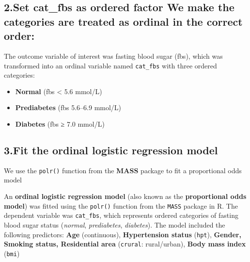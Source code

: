 \documentclass[
  letterpaper,
  DIV=11,
  numbers=noendperiod]{scrartcl}
\newenvironment{Shaded}{\begin{snugshade}}{\end{snugshade}}
\newcommand{\AttributeTok}[1]{\textcolor[rgb]{0.40,0.45,0.13}{#1}}
\newcommand{\FunctionTok}[1]{\textcolor[rgb]{0.28,0.35,0.67}{#1}}
\newcommand{\NormalTok}[1]{\textcolor[rgb]{0.00,0.23,0.31}{#1}}
\newcommand{\OtherTok}[1]{\textcolor[rgb]{0.00,0.23,0.31}{#1}}
\newcommand{\SpecialCharTok}[1]{\textcolor[rgb]{0.37,0.37,0.37}{#1}}
\newcommand{\StringTok}[1]{\textcolor[rgb]{0.13,0.47,0.30}{#1}}
\begin{document}
\subsection{\texorpdfstring{2.Set cat\_fbs as ordered factor We make the
categories are treated as \textbf{ordinal} in the correct
order:}{2.Set cat\_fbs as ordered factor We make the categories are treated as ordinal in the correct order:}}\label{set-cat_fbs-as-ordered-factor-we-make-the-categories-are-treated-as-ordinal-in-the-correct-order}

The outcome variable of interest was fasting blood sugar (fbs), which
was transformed into an ordinal variable named \texttt{cat\_fbs} with
three ordered categories:

\begin{itemize}
\item
  \textbf{Normal} (fbs \textless{} 5.6 mmol/L)
\item
  \textbf{Prediabetes} (fbs 5.6--6.9 mmol/L)
\item
  \textbf{Diabetes} (fbs ≥ 7.0 mmol/L)
\end{itemize}

\begin{Shaded}
\end{Shaded}

\subsection{3.Fit the ordinal logistic regression
model}\label{fit-the-ordinal-logistic-regression-model}

We use the \texttt{polr()} function from the \textbf{MASS} package to
fit a proportional odds model

An \textbf{ordinal logistic regression model} (also known as the
\textbf{proportional odds model}) was fitted using the \texttt{polr()}
function from the \texttt{MASS} package in R. The dependent variable was
\texttt{cat\_fbs}, which represents ordered categories of fasting blood
sugar status (\emph{normal}, \emph{prediabetes}, \emph{diabetes}). The
model included the following predictors: \textbf{Age} (continuous),
\textbf{Hypertension status} (\texttt{hpt}), \textbf{Gender, Smoking
status, Residential area} (\texttt{crural}: rural/urban), \textbf{Body
mass index} (\texttt{bmi})
\end{document}
